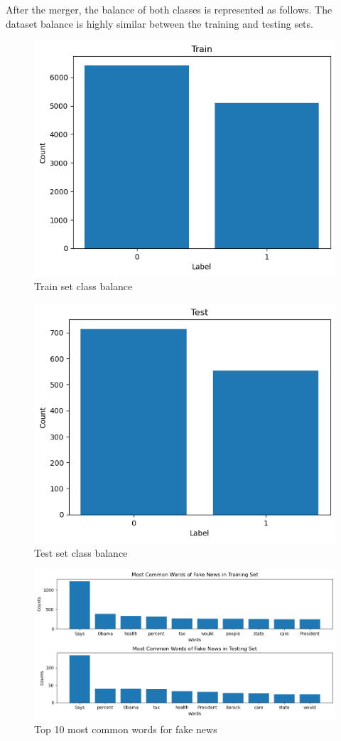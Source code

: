 After the merger, the balance of both classes is represented as follows. The dataset balance is highly similar between the training and testing sets.

\begin{figure}[!htbp]
\centering
\includegraphics[width=0.7\linewidth]{train_balance.png}
\caption{Train set class balance}
\label{train_balance}
\end{figure}

\begin{figure}[!htbp]
\centering
\includegraphics[width=0.7\linewidth]{test_balance.png}
\caption{Test set class balance}
\label{test_balance}
\end{figure}

\begin{figure}[!htbp]
\centering
\includegraphics[width=0.7\linewidth]{top10_common_words_fake.png}
\caption{Top 10 most common words for fake news}
\label{top10_common_words_fake}
\end{figure}


